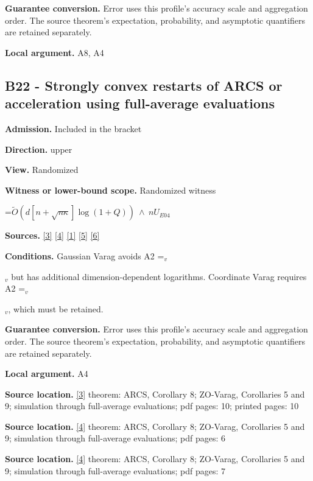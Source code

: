 \documentclass[10pt,a4paper]{article}
\newcommand{\AtlasMath}[1]{\par\begingroup\centering\setbox0=\hbox{$\displaystyle #1$}\ifdim\wd0>1.4\linewidth\typeout{ATLAS WIDE FORMULA: \the\wd0}\fi\ifdim\wd0>\linewidth\resizebox{\linewidth}{!}{\box0}\else\box0\fi\par\endgroup}
\newcommand{\AtlasInlineMath}[1]{\begingroup\setbox0=\hbox{$#1$}\ifdim\wd0>.4\linewidth\endgroup\AtlasMath{#1}\else\endgroup$#1$\fi}
\begin{document}
\textbf{Guarantee conversion.} Error uses this profile's accuracy scale and aggregation order. The source theorem's expectation, probability, and asymptotic quantifiers are retained separately.

\textbf{Local argument.} A8, A4

\subsection{B22 - Strongly convex restarts of ARCS or acceleration using full-average evaluations}
\textbf{Admission.} Included in the bracket

\textbf{Direction.} upper

\textbf{View.} Randomized

\textbf{Witness or lower-bound scope.} Randomized witness

\AtlasMath{\widetilde{O}(d[n+\sqrt{n\kappa}]\log(1+Q))\ \wedge\ nU_{E04}}
\textbf{Sources.} \href{https://arxiv.org/abs/2109.08858}{[3]} \href{https://proceedings.mlr.press/v119/chen20r/chen20r.pdf}{[4]} \href{https://arxiv.org/html/2610.00345v1}{[1]} \href{https://arxiv.org/html/2607.16558v2}{[5]} \href{https://www.mathnet.ru/php/archive.phtml?jrnid=mzm&option_lang=eng&paperid=1697&wshow=paper}{[6]}

\textbf{Conditions.} Gaussian Varag avoids A2 \AtlasInlineMath{_v} but has additional dimension-dependent logarithms. Coordinate Varag requires A2 \AtlasInlineMath{_v}, which must be retained.

\textbf{Guarantee conversion.} Error uses this profile's accuracy scale and aggregation order. The source theorem's expectation, probability, and asymptotic quantifiers are retained separately.

\textbf{Local argument.} A4

\textbf{Source location.} \href{https://arxiv.org/abs/2109.08858}{[3]} theorem: ARCS, Corollary 8; ZO-Varag, Corollaries 5 and 9; simulation through full-average evaluations; pdf pages: 10; printed pages: 10

\textbf{Source location.} \href{https://proceedings.mlr.press/v119/chen20r/chen20r.pdf}{[4]} theorem: ARCS, Corollary 8; ZO-Varag, Corollaries 5 and 9; simulation through full-average evaluations; pdf pages: 6

\textbf{Source location.} \href{https://proceedings.mlr.press/v119/chen20r/chen20r.pdf}{[4]} theorem: ARCS, Corollary 8; ZO-Varag, Corollaries 5 and 9; simulation through full-average evaluations; pdf pages: 7
\end{document}
